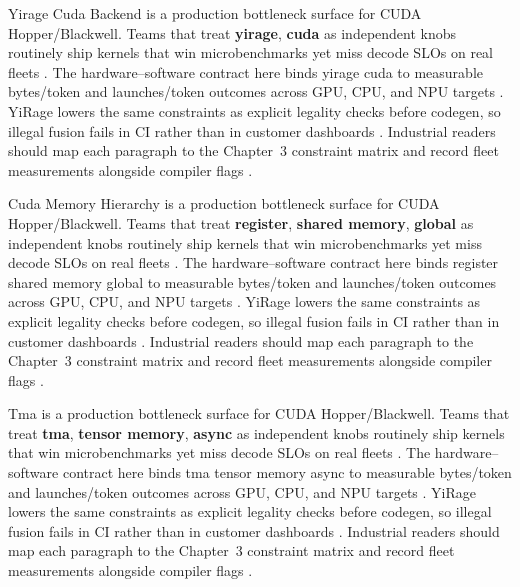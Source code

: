 Yirage Cuda Backend is a production bottleneck surface for CUDA Hopper/Blackwell. Teams that treat \textbf{yirage}, \textbf{cuda} as independent knobs routinely ship kernels that win microbenchmarks yet miss decode SLOs on real fleets \citep{dlbook,nvidia2024cudagraphs}. The hardware--software contract here binds yirage cuda to measurable bytes/token and launches/token outcomes across GPU, CPU, and NPU targets \citep{dao2022flashattention,liu2024deepseekv3}. YiRage lowers the same constraints as explicit legality checks before codegen, so illegal fusion fails in CI rather than in customer dashboards \citep{kwon2023vllm,patel2025llminference}. Industrial readers should map each paragraph to the Chapter~3 constraint matrix and record fleet measurements alongside compiler flags \citep{nvidia2024cudagraphs,taxbreak2026}.

Cuda Memory Hierarchy is a production bottleneck surface for CUDA Hopper/Blackwell. Teams that treat \textbf{register}, \textbf{shared memory}, \textbf{global} as independent knobs routinely ship kernels that win microbenchmarks yet miss decode SLOs on real fleets \citep{dao2022flashattention,liu2024deepseekv3}. The hardware--software contract here binds register shared memory global to measurable bytes/token and launches/token outcomes across GPU, CPU, and NPU targets \citep{kwon2023vllm,patel2025llminference}. YiRage lowers the same constraints as explicit legality checks before codegen, so illegal fusion fails in CI rather than in customer dashboards \citep{nvidia2024cudagraphs,taxbreak2026}. Industrial readers should map each paragraph to the Chapter~3 constraint matrix and record fleet measurements alongside compiler flags \citep{liu2024deepseekv3,memoryfloor2026}.

Tma is a production bottleneck surface for CUDA Hopper/Blackwell. Teams that treat \textbf{tma}, \textbf{tensor memory}, \textbf{async} as independent knobs routinely ship kernels that win microbenchmarks yet miss decode SLOs on real fleets \citep{kwon2023vllm,patel2025llminference}. The hardware--software contract here binds tma tensor memory async to measurable bytes/token and launches/token outcomes across GPU, CPU, and NPU targets \citep{nvidia2024cudagraphs,taxbreak2026}. YiRage lowers the same constraints as explicit legality checks before codegen, so illegal fusion fails in CI rather than in customer dashboards \citep{liu2024deepseekv3,memoryfloor2026}. Industrial readers should map each paragraph to the Chapter~3 constraint matrix and record fleet measurements alongside compiler flags \citep{patel2025llminference,nvidia2022hopper}.

